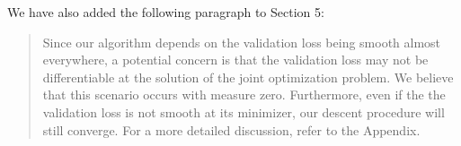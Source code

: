 \documentclass[]{article}
\begin{document}
\begin{enumerate}
		We have also added the following paragraph to Section 5:
		\begin{quote}
			Since our algorithm depends on the validation loss being smooth almost everywhere, a potential concern is that the validation loss may not be differentiable at the solution of the joint optimization problem. We believe that this scenario occurs with measure zero. Furthermore, even if the the validation loss is not smooth at its minimizer, our descent procedure will still converge. For a more detailed discussion, refer to the Appendix.
		\end{quote}
		
		
	\end{enumerate}



\end{document}
